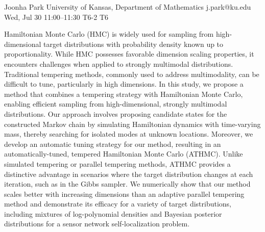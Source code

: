 \begin{talk}
  {Joonha Park}%
  {University of Kansas, Department of Mathematics}%
  {j.park@ku.edu}%
  {}%
  {}%
  {}%
  {Wed, Jul 30 11:00–11:30}%
  {T6-2}%
  {T6}%
  {}%
  
				

Hamiltonian Monte Carlo (HMC) is widely used for sampling from high-dimensional target distributions with probability density known up to proportionality. While HMC possesses favorable dimension scaling properties, it encounters challenges when applied to strongly multimodal distributions. Traditional tempering methods, commonly used to address multimodality, can be diﬃcult to tune, particularly in high dimensions. In this study, we propose a method that combines a tempering strategy with Hamiltonian Monte Carlo, enabling eﬃcient sampling from high-dimensional, strongly multimodal distributions. Our approach involves proposing candidate states for the constructed Markov chain by simulating Hamiltonian dynamics with time-varying mass, thereby searching for isolated modes at unknown locations. Moreover, we develop an automatic tuning strategy for our method, resulting in an automatically-tuned, tempered Hamiltonian Monte Carlo (ATHMC). Unlike simulated tempering or parallel tempering methods, ATHMC provides a distinctive advantage in scenarios where the target distribution changes at each iteration, such as in the Gibbs sampler. We numerically show that our method scales better with increasing dimensions than an adaptive parallel tempering method and demonstrate its eﬃcacy for a variety of target distributions, including mixtures of log-polynomial densities and Bayesian posterior distributions for a sensor network self-localization problem.
			
\end{talk}

